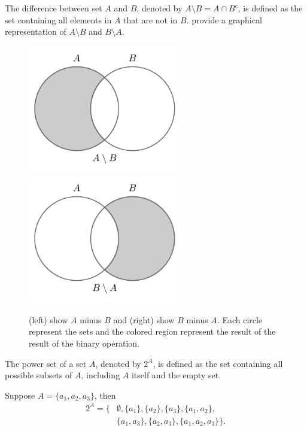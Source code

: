 \begin{definition}[Difference]
	The difference between set $A$ and $B$, denoted by $A \setminus B = A\cap B^c$, is defined as the set containing all elements in $A$ that are not in $B$.  provide a graphical representation of $A\setminus B$ and $B\setminus A$.
	\begin{figure}[H]
		\centering
		\includegraphics[width = 0.6\textwidth]{figures/set_minus.pdf}
		\includegraphics[width = 0.6\textwidth]{figures/set_minus2.pdf}
		\caption{(left) show $A$ minus $B$ and (right) show $B$ minus $A$. Each circle represent the sets and the colored region represent the result of the result of the binary operation.}
		\label{fig:set_minus}
	\end{figure}
\end{definition}

\begin{definition}
	The power set of a set $A$, denoted by $2^A$, is defined as the set containing all possible subsets of $A$, including $A$ itself and the empty set.
\end{definition}

\begin{example}
	Suppose $A = \{a_1,a_2,a_3\}$, then
	\begin{equation}
		\begin{split}
			2^A = \{&\emptyset, \{a_1\}, \{a_2\}, \{a_3\}, \{a_1, a_2\},\\
			& \{a_1, a_3\}, \{a_2, a_3\}, \{a_1, a_2, a_3\}\}.
		\end{split}
	\end{equation}
\end{example}

